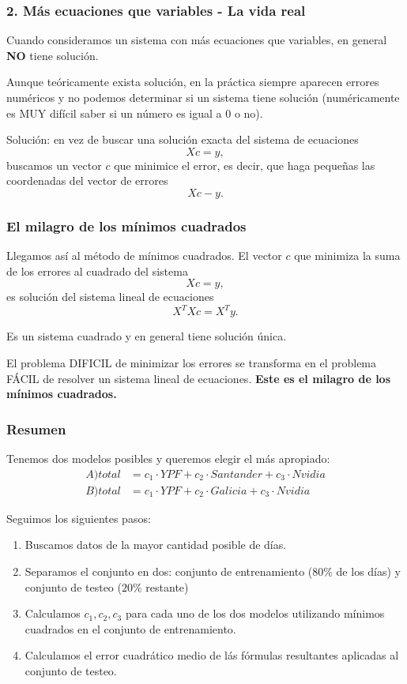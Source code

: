 \documentclass[aspectratio=169,12pt]{beamer}
\begin{document}
\begin{frame}
\frametitle{2. Más ecuaciones que variables - La vida real}

Cuando consideramos un sistema con más ecuaciones que variables, en general \textbf{NO} tiene solución.

Aunque teóricamente exista solución, en la práctica siempre aparecen errores numéricos y no podemos determinar si un sistema tiene solución
(numéricamente es MUY difícil saber si un número es igual a 0 o no).

Solución: en vez de buscar una solución exacta del sistema de ecuaciones
$$ X c = y,$$
buscamos un vector $c$ que minimice el error, es decir, que haga pequeñas las coordenadas del vector de errores
$$ X c - y.$$

\end{frame}



\begin{frame}
\frametitle{El milagro de los mínimos cuadrados}

Llegamos así al método de mínimos cuadrados. El vector $c$ que  minimiza la suma de los errores al cuadrado del sistema
$$ X c = y,$$
es solución del sistema lineal de ecuaciones
$$ X^T X c = X^T y.$$

Es un sistema cuadrado y en general tiene solución única.

El problema DIFICIL de minimizar los errores se transforma en el problema FÁCIL de resolver un sistema lineal de ecuaciones. \textbf{Este es el
milagro de los mínimos cuadrados.}

\end{frame}


\begin{frame}
\frametitle{Resumen}

Tenemos dos modelos posibles y queremos elegir el más apropiado:
\begin{align*}
A) total &= c_1 \cdot YPF + c_2 \cdot Santander + c_3 \cdot Nvidia \\
B) total &= c_1 \cdot YPF + c_2 \cdot Galicia + c_3 \cdot Nvidia
\end{align*}

Seguimos los siguientes pasos:
\begin{enumerate}
\item Buscamos datos de la mayor cantidad posible de días.
\item Separamos el conjunto en dos: conjunto de entrenamiento ($80\%$ de los días) y conjunto de testeo ($20\%$ restante)
\item Calculamos $c_1, c_2, c_3$ para cada uno de los dos modelos utilizando mínimos cuadrados en el conjunto de entrenamiento.
\item Calculamos el error cuadrático medio de lás fórmulas resultantes aplicadas al conjunto de testeo.
\end{enumerate}

\end{frame}
\end{document}
